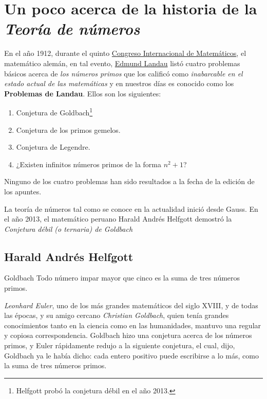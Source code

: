 \chapter*{Un poco acerca de la historia de la \emph{Teoría de números}}

En el año 1912, durante el quinto 
\href{https://www.mathunion.org/organization/imu-history}{Congreso Internacional de Matemáticos}, el matemático alemán, en tal evento, \href{https://en.wikipedia.org/wiki/Edmund_Landau}{Edmund Landau} listó cuatro problemas básicos acerca de \emph{los números primos} que los calificó como \emph{inabarcable en el estado actual de las matemáticas} y en nuestros días es conocido como los \textbf{Problemas de Landau}. Ellos son los siguientes:
\begin{enumerate}
	\item Conjetura de Goldbach\footnote{Helfgott probó la conjetura débil en el año 2013.}
	\item Conjetura de los primos gemelos.
	\item Conjetura de Legendre.
	\item ¿Existen infinitos números primos de la forma $n^{2}+1$?
\end{enumerate}

Ninguno de los cuatro problemas han sido resultados a la fecha de la edición de los apuntes.

La teoría de números tal como se conoce en la actualidad inició desde Gauss. En el año 2013, el matemático peruano Harald Andrés Helfgott demostró la \emph{Conjetura débil (o ternaria) de Goldbach}
\section{Harald Andrés Helfgott}
\begin{conjecture}{Goldbach}
Todo número impar mayor que cinco es la suma de tres números primos.
\end{conjecture}
\emph{Leonhard Euler}, uno de los más grandes matemáticos del siglo XVIII, y de todas las épocas, y su amigo cercano \emph{Christian Goldbach}, quien tenía grandes conocimientos tanto en la ciencia como en las humanidades, mantuvo una regular y copiosa correspondencia. Goldbach hizo una conjetura acerca de los números primos, y Euler rápidamente redujo a la siguiente conjetura, el cual, dijo, Goldbach ya le había dicho: cada entero positivo puede escribirse a lo más, como la suma de tres números primos.

